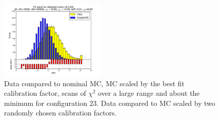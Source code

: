 \begin{figure}[htbp]
\begin{center}
\includegraphics[width=0.45\textwidth]{../FIGURES/23/FIG_Fit_result_for_calibration_factor_of_0_820.pdf} 
\caption{Data compared to nominal MC, MC scaled by the best fit calibration factor, scans of $\chi^2$ over a large range and about the minimum for configuration 23. Data compared to MC scaled by two randomly chosen calibration factors.} 
\label{tab:best_23} 
\end{center} \end{figure} 


